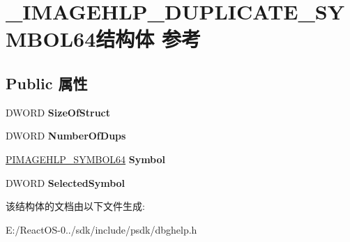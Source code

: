 \hypertarget{struct___i_m_a_g_e_h_l_p___d_u_p_l_i_c_a_t_e___s_y_m_b_o_l64}{}\section{\+\_\+\+I\+M\+A\+G\+E\+H\+L\+P\+\_\+\+D\+U\+P\+L\+I\+C\+A\+T\+E\+\_\+\+S\+Y\+M\+B\+O\+L64结构体 参考}
\label{struct___i_m_a_g_e_h_l_p___d_u_p_l_i_c_a_t_e___s_y_m_b_o_l64}
\subsection*{Public 属性}
\begin{DoxyCompactItemize}
\item 
\mbox{\label{struct___i_m_a_g_e_h_l_p___d_u_p_l_i_c_a_t_e___s_y_m_b_o_l64_a918ef04a7359fdf3c7d5d7716bd288ac}} 
D\+W\+O\+RD {\bfseries Size\+Of\+Struct}
\item 
\mbox{\label{struct___i_m_a_g_e_h_l_p___d_u_p_l_i_c_a_t_e___s_y_m_b_o_l64_a827059c48b4f9cb55c3e25336e24475e}} 
D\+W\+O\+RD {\bfseries Number\+Of\+Dups}
\item 
\mbox{\label{struct___i_m_a_g_e_h_l_p___d_u_p_l_i_c_a_t_e___s_y_m_b_o_l64_a0c669fa26011c643fd0bc2a4ccf4aba1}} 
\hyperlink{struct___i_m_a_g_e_h_l_p___s_y_m_b_o_l64}{P\+I\+M\+A\+G\+E\+H\+L\+P\+\_\+\+S\+Y\+M\+B\+O\+L64} {\bfseries Symbol}
\item 
\mbox{\label{struct___i_m_a_g_e_h_l_p___d_u_p_l_i_c_a_t_e___s_y_m_b_o_l64_a3b96d85d68432ac5fbb8f9f562757c3d}} 
D\+W\+O\+RD {\bfseries Selected\+Symbol}
\end{DoxyCompactItemize}


该结构体的文档由以下文件生成\+:\begin{DoxyCompactItemize}
\item 
E\+:/\+React\+O\+S-\/0../sdk/include/psdk/dbghelp.\+h\end{DoxyCompactItemize}

